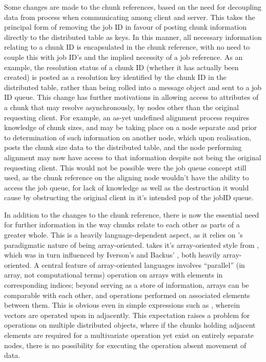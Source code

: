 Some changes are made to the chunk references, based on the need for decoupling data
from process when communicating among client and server.
This takes the principal form of removing the job ID in favour of posting chunk
information directly to the distributed table as keys.
In this manner, all necessary information relating to a chunk ID is
encapsulated in the chunk reference, with no need to couple this with job ID's
and the implied necessity of a job reference.
As an example, the resolution status of a chunk ID (whether it has actually
been created) is posted as a resolution key identified by the chunk ID in the
distributed table, rather than being rolled into a message object and sent to a
job ID queue.
This change has further motivations in allowing access to attributes of a chunk
that may resolve asynchronously, by nodes other than the original requesting
client.
For example, an as-yet undefined alignment process requires knowledge of chunk
sizes, and may be taking place on a node separate and prior to determination of
such information on another node, which upon realisation, posts the chunk size
data to the distributed table, and the node performing alignment may now have
access to that information despite not being the original requesting client.
This would not be possible were the job queue concept still used, as the chunk
reference on the aligning node wouldn't have the ability to access the job
queue, for lack of knowledge as well as the destruction it would cause by
obstructing the original client in it's intended pop of the jobID queue.

In addition to the changes to the chunk reference, there is now the essential
need for further information in the way chunks relate to each other as parts of
a greater whole.
This is a heavily language-dependent aspect, as it relies on \R's paradigmatic
nature of being array-oriented.
\R takes it's array-oriented style from , which was in turn influenced by
Iverson's  and Backus' , both heavily
array-oriented\cites{becker1994shistory,iverson2007notation}.
A central feature of array-oriented languages involves ``parallel'' (in array,
not computational terms) operation on arrays with elements in corresponding
indices; beyond serving as a store of information, arrays can be comparable
with each other, and operations performed on associated elements between them.
This is obvious even in simple expressions such as 
, wherein vectors are operated upon in
adjacently.
This expectation raises a problem for operations on multiple distributed
objects, where if the chunks holding adjacent elements are required for a
multivariate operation yet exist on entirely separate nodes, there is no
possibility for executing the operation absent movement of data.

